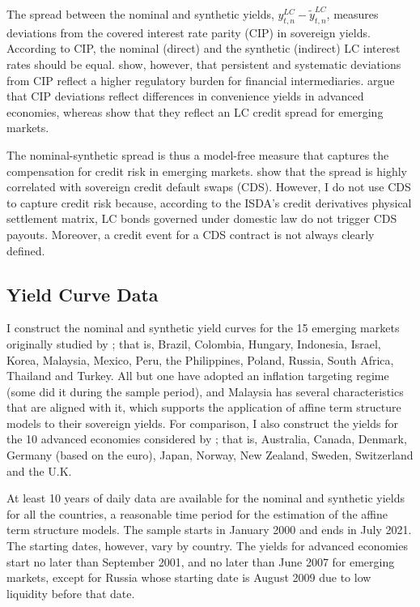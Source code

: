 \documentclass[a4paper, 12pt]{article}
\providecommand{\tnr}{n}
\providecommand{\idxt}{t}
\providecommand{\idxs}{\idxt,\tnr}
\providecommand{\yld}{y}
\providecommand{\yLCnom}{\yld_{\idxs} ^{LC}}
\providecommand{\yLCsynt}{\widetilde{\yld}_{\idxs} ^{LC}}
\begin{document}
The spread between the nominal and synthetic yields, \(\yLCnom - \yLCsynt\), measures deviations from the covered interest rate parity (CIP) in sovereign yields. According to CIP, the nominal (direct) and the synthetic (indirect) LC interest rates should be equal. \cite{DuTepperVerdelhan:2018} show, however, that persistent and systematic deviations from CIP reflect a higher regulatory burden for financial intermediaries. \cite{DuImSchreger:2018JIE} argue that CIP deviations reflect differences in convenience yields in advanced economies, whereas \cite{DuSchreger:2016JoF} show that they reflect an LC credit spread for emerging markets. 

The nominal-synthetic spread is thus a model-free measure that captures the compensation for credit risk in emerging markets. \cite{DuSchreger:2016JoF} show that the spread is highly correlated with sovereign credit default swaps (CDS). However, I do not use CDS to capture credit risk because, according to the ISDA's credit derivatives physical settlement matrix, LC bonds governed under domestic law do not trigger CDS payouts. Moreover, a credit event for a CDS contract is not always clearly defined. 

\subsection{Yield Curve Data}
I construct the nominal and synthetic yield curves for the 15 emerging markets originally studied by \cite{DuSchreger:2016JoF}; that is, Brazil, Colombia, Hungary, Indonesia, Israel, Korea, Malaysia, Mexico, Peru, the Philippines, Poland, Russia, South Africa, Thailand and Turkey. All but one have adopted an inflation targeting regime (some did it during the sample period), and Malaysia has several characteristics that are aligned with it, which supports the application of affine term structure models to their sovereign yields. For comparison, I also construct the yields for the 10 advanced economies considered by \cite{DuImSchreger:2018JIE}; that is, Australia, Canada, Denmark, Germany (based on the euro), Japan, Norway, New Zealand, Sweden, Switzerland and the U.K. 

At least 10 years of daily data are available for the nominal and synthetic yields for all the countries, a reasonable time period for the estimation of the affine term structure models. The sample starts in January 2000 and ends in July 2021.  The starting dates, however, vary by country. The yields for advanced economies start no later than September 2001, and no later than June 2007 for emerging markets, except for Russia whose starting date is August 2009 due to low liquidity before that date. 
\end{document}
